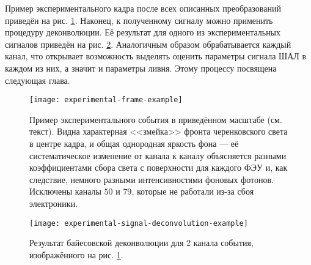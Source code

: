 Пример экспериментального кадра после всех описанных преобразований приведён на рис. \ref{pic:experimental-frame-example}. Наконец, к полученному сигналу можно применить процедуру деконволюции. Её результат для одного из экспериментальных сигналов приведён на рис. \ref{pic:experimental-signal-deconvolution-example}. Аналогичным образом обрабатывается каждый канал, что открывает возможность выделять оценить параметры сигнала ШАЛ в каждом из них, а значит и параметры ливня. Этому процессу посвящена следующая глава.

\begin{figure}
	\centering
	\texttt{[image: experimental-frame-example]}
	\caption{Пример экспериментального события в приведённом масштабе (см. текст). Видна характерная <<змейка>> фронта черенковского света в центре кадра, и общая однородная яркость фона --- её систематическое изменение от канала к каналу объясняется разными коэффициентами сбора света с поверхности для каждого ФЭУ и, как следствие, немного разными интенсивностями фоновых фотонов. Исключены каналы $50$ и $79$, которые не работали из-за сбоя электроники.}
	\label{pic:experimental-frame-example}
\end{figure}

\begin{figure}
	\centering
	\texttt{[image: experimental-signal-deconvolution-example]}
	\caption{Результат байесовской деконволюции для 2 канала события, изображённого на рис. \ref{pic:experimental-frame-example}.}
	\label{pic:experimental-signal-deconvolution-example}
\end{figure}

